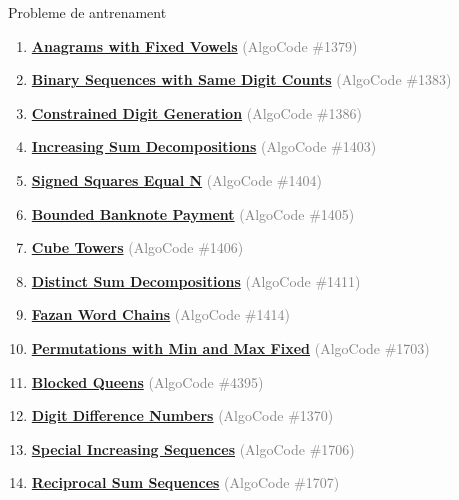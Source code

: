 ﻿\documentclass[10pt]{beamer}
\begin{document}
\begin{frame}{Probleme de antrenament}
  \begin{enumerate}\footnotesize\itemsep0pt
    \item \href{https://code.algolymp.com/problems/1379}{\textbf{Anagrams with Fixed Vowels}}
          \textcolor{gray}{(AlgoCode \#1379)}
    \item \href{https://code.algolymp.com/problems/1383}{\textbf{Binary Sequences with Same Digit Counts}}
          \textcolor{gray}{(AlgoCode \#1383)}
    \item \href{https://code.algolymp.com/problems/1386}{\textbf{Constrained Digit Generation}}
          \textcolor{gray}{(AlgoCode \#1386)}
    \item \href{https://code.algolymp.com/problems/1403}{\textbf{Increasing Sum Decompositions}}
          \textcolor{gray}{(AlgoCode \#1403)}
    \item \href{https://code.algolymp.com/problems/1404}{\textbf{Signed Squares Equal N}}
          \textcolor{gray}{(AlgoCode \#1404)}
    \item \href{https://code.algolymp.com/problems/1405}{\textbf{Bounded Banknote Payment}}
          \textcolor{gray}{(AlgoCode \#1405)}
    \item \href{https://code.algolymp.com/problems/1406}{\textbf{Cube Towers}}
          \textcolor{gray}{(AlgoCode \#1406)}
    \item \href{https://code.algolymp.com/problems/1411}{\textbf{Distinct Sum Decompositions}}
          \textcolor{gray}{(AlgoCode \#1411)}
    \item \href{https://code.algolymp.com/problems/1414}{\textbf{Fazan Word Chains}}
          \textcolor{gray}{(AlgoCode \#1414)}
    \item \href{https://code.algolymp.com/problems/1703}{\textbf{Permutations with Min and Max Fixed}}
          \textcolor{gray}{(AlgoCode \#1703)}
    \item \href{https://code.algolymp.com/problems/4395}{\textbf{Blocked Queens}}
          \textcolor{gray}{(AlgoCode \#4395)}
    \item \href{https://code.algolymp.com/problems/1370}{\textbf{Digit Difference Numbers}}
          \textcolor{gray}{(AlgoCode \#1370)}
    \item \href{https://code.algolymp.com/problems/1706}{\textbf{Special Increasing Sequences}}
          \textcolor{gray}{(AlgoCode \#1706)}
    \item \href{https://code.algolymp.com/problems/1707}{\textbf{Reciprocal Sum Sequences}}
          \textcolor{gray}{(AlgoCode \#1707)}
  \end{enumerate}
\end{frame}
\end{document}
